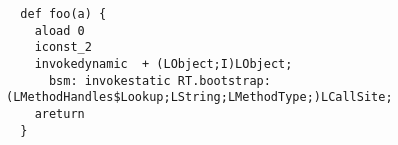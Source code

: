 {\tiny \begin{verbatim}
  def foo(a) {
    aload 0
    iconst_2 
    invokedynamic  + (LObject;I)LObject;
      bsm: invokestatic RT.bootstrap:(LMethodHandles$Lookup;LString;LMethodType;)LCallSite;
    areturn 
  }
\end{verbatim} }